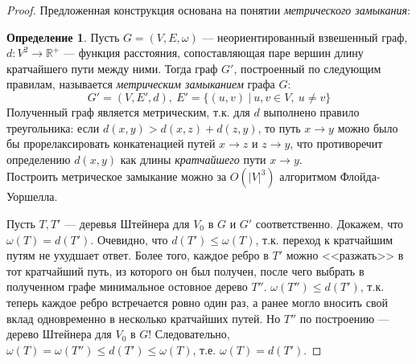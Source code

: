 \documentclass[11pt,a4paper]{report}
\def\Real{\mathbb{R}}
\def\le{\leqslant}
\theoremstyle{definition}
\theoremstyle{definition}
\theoremstyle{definition}
\newtheorem{definition}{Определение}[section]
\begin{document}
		\begin{proof}
			Предложенная конструкция основана на понятии \textit{метрического замыкания}:
			\begin{definition}
				Пусть $ G = (V, E, \omega) $ — неориентированный взвешенный граф, $d: V^2 \to \Real^{+} $ — функция расстояния, сопоставляющая паре вершин длину кратчайшего пути между ними. Тогда граф $G'$, построенный по следующим правилам, называется \textit{метрическим замыканием} графа $G$:
				$$
					G' = (V, E', d),\ E' = \{ (u, v)\ |\ u, v \in V,\ u \neq v \}
				$$
				Полученный граф является метрическим, т.к. для $d$ выполнено правило треугольника: если $ d(x, y) > d(x, z) + d(z, y) $, то путь $x \to y$ можно было бы прорелаксировать конкатенацией путей $x \to z$ и $z \to y$, что противоречит определению $d(x, y)$ как длины \textit{кратчайшего} пути $x \to y$.\\
				Построить метрическое замыкание можно за $O(|V|^3)$ алгоритмом Флойда-Уоршелла. 
			\end{definition}
			\noindent Пусть $T, T'$ — деревья Штейнера для $V_0$ в $ G $ и $ G' $ соответственно. Докажем, что $\omega(T) = d(T')$. Очевидно, что $ d(T') \le \omega(T) $, т.к. переход к кратчайшим путям не ухудшает ответ. Более того, каждое ребро в $T'$ можно <<разжать>> в тот кратчайший путь, из которого он был получен, после чего выбрать в полученном графе минимальное остовное дерево $T''$. $\omega(T'') \le d(T')$, т.к. теперь каждое ребро встречается ровно один раз, а ранее могло вносить свой вклад одновременно в несколько кратчайших путей. Но $T''$ по построению — дерево Штейнера для $V_0$ в $G$! Следовательно, $ \omega(T) = \omega(T'') \le d(T') \le \omega(T)$, т.е. $\omega(T) = d(T')$.
 		\end{proof}
\end{document}
